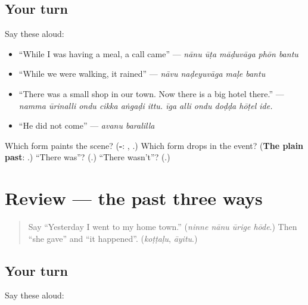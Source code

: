 \subsection*{Your turn}
Say these aloud:

\begin{itemize}
\raggedright
  \item \textquotedblleft{}While I was having a meal, a call came\textquotedblright{} — \emph{nānu ūṭa māḍuvāga phōn bantu}
  \item \textquotedblleft{}While we were walking, it rained\textquotedblright{} — \emph{nāvu naḍeyuvāga maḷe bantu}
  \item \textquotedblleft{}There was a small shop in our town. Now there is a big hotel there.\textquotedblright{} — \emph{namma ūrinalli ondu cikka aṅgaḍi ittu. īga alli ondu doḍḍa hōṭel ide.}
  \item \textquotedblleft{}He did not come\textquotedblright{} — \emph{avanu baralilla}
\end{itemize}

\begin{tcolorbox}[breakable,colback=teal!4,colframe=teal!35!black,title={Before you move on}]
Which form paints the scene? (\textbf{-}: \textbf{}, \textbf{}.) Which form drops in the event? (\textbf{The plain past}: \textbf{}.) \textquotedblleft{}There was\textquotedblright{}? (\textbf{}.) \textquotedblleft{}There wasn't\textquotedblright{}? (\textbf{}.)
\end{tcolorbox}
\section[(review)]{Review — the past three ways}

\label{lesson:KA-R309-the-past-three-ways}



\begin{quote}
Say \textquotedblleft{}Yesterday I went to my home town.\textquotedblright{} (\emph{ninne nānu ūrige hōde}.) Then \textquotedblleft{}she gave\textquotedblright{} and \textquotedblleft{}it happened\textquotedblright{}. (\emph{koṭṭaḷu}, \emph{āyitu}.)
\end{quote}

\subsection*{Your turn}
Say these aloud:

